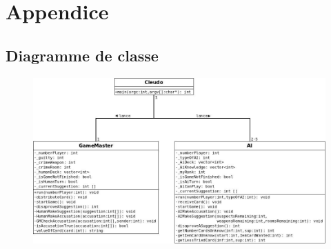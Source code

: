 \documentclass[a4paper,10pt]{article}
\begin{document}
 	
 	
 	

\pagebreak
\section{Appendice}
	
	
	  	
	 \subsection{Diagramme de classe}\hypertarget{classDiag}{}
		\begin{figure}[H] \hspace*{-2cm} 
    	\centering
   		  \includegraphics[width=500pt]{Diag-Classe.jpeg} 
	  	\end{figure}
	 
\end{document}
